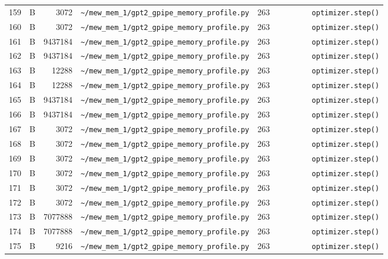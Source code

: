 \documentclass{article}
\begin{document}
\begin{longtable}{r l r p{6.5cm} r p{7.0cm}}
159 & B & 3072 & \lstinline|~/mew_mem_1/gpt2_gpipe_memory_profile.py| & 263 & \lstinline|        optimizer.step()| \\
160 & B & 3072 & \lstinline|~/mew_mem_1/gpt2_gpipe_memory_profile.py| & 263 & \lstinline|        optimizer.step()| \\
161 & B & 9437184 & \lstinline|~/mew_mem_1/gpt2_gpipe_memory_profile.py| & 263 & \lstinline|        optimizer.step()| \\
162 & B & 9437184 & \lstinline|~/mew_mem_1/gpt2_gpipe_memory_profile.py| & 263 & \lstinline|        optimizer.step()| \\
163 & B & 12288 & \lstinline|~/mew_mem_1/gpt2_gpipe_memory_profile.py| & 263 & \lstinline|        optimizer.step()| \\
164 & B & 12288 & \lstinline|~/mew_mem_1/gpt2_gpipe_memory_profile.py| & 263 & \lstinline|        optimizer.step()| \\
165 & B & 9437184 & \lstinline|~/mew_mem_1/gpt2_gpipe_memory_profile.py| & 263 & \lstinline|        optimizer.step()| \\
166 & B & 9437184 & \lstinline|~/mew_mem_1/gpt2_gpipe_memory_profile.py| & 263 & \lstinline|        optimizer.step()| \\
167 & B & 3072 & \lstinline|~/mew_mem_1/gpt2_gpipe_memory_profile.py| & 263 & \lstinline|        optimizer.step()| \\
168 & B & 3072 & \lstinline|~/mew_mem_1/gpt2_gpipe_memory_profile.py| & 263 & \lstinline|        optimizer.step()| \\
169 & B & 3072 & \lstinline|~/mew_mem_1/gpt2_gpipe_memory_profile.py| & 263 & \lstinline|        optimizer.step()| \\
170 & B & 3072 & \lstinline|~/mew_mem_1/gpt2_gpipe_memory_profile.py| & 263 & \lstinline|        optimizer.step()| \\
171 & B & 3072 & \lstinline|~/mew_mem_1/gpt2_gpipe_memory_profile.py| & 263 & \lstinline|        optimizer.step()| \\
172 & B & 3072 & \lstinline|~/mew_mem_1/gpt2_gpipe_memory_profile.py| & 263 & \lstinline|        optimizer.step()| \\
173 & B & 7077888 & \lstinline|~/mew_mem_1/gpt2_gpipe_memory_profile.py| & 263 & \lstinline|        optimizer.step()| \\
174 & B & 7077888 & \lstinline|~/mew_mem_1/gpt2_gpipe_memory_profile.py| & 263 & \lstinline|        optimizer.step()| \\
175 & B & 9216 & \lstinline|~/mew_mem_1/gpt2_gpipe_memory_profile.py| & 263 & \lstinline|        optimizer.step()| \\

\end{longtable}
\end{document}
